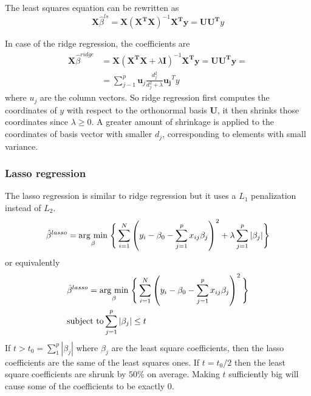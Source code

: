 The least squares equation can be rewritten as 
\begin{equation}
\mathbf{X}\hat{\beta}^{ls}  = \mathbf{X\left( X^TX\right)}^{-1}\mathbf{X^Ty} = \mathbf{UU^T}y
\end{equation}

In case of the ridge regression, the coefficients are
\begin{equation}
\begin{aligned}
\mathbf{X}\hat{\beta}^{ridge}  &= \mathbf{X}\left( \mathbf{X^TX} +\lambda \mathbf{I} \right)^{-1}\mathbf{X^Ty} = \mathbf{UU^Ty} =\\
&= \sum_{j-1}^p \mathbf{u}_j \frac{d_j^2}{d_j^2+\lambda} \mathbf{u_j}^Ty
\end{aligned}
\end{equation}
where $u_j$ are the column vectors. So ridge regression first computes the coordinates of $y$ with respect to the orthonormal basis $\mathbf{U}$, it then shrinks those coordinates since $\lambda\ge0$. A greater amount of shrinkage is applied to the coordinates of basis vector with smaller $d_j$, corresponding to elements with small variance.

\subsubsection{Lasso regression}
The lasso regression is similar to ridge regression but it uses a $L_1$ penalization instead of $L_2$.
\begin{equation}
\label{blasso}
\hat{\beta}^{lasso} = \underset{\beta}{\operatorname{arg}\,\operatorname{min}}\; \Bigg\lbrace \sum_{i=1}^N \left( y_i -  \beta_0 - \sum_{j=1}^p x_{ij} \beta_j\right)^2+ \lambda \sum_{j=1}^p |\beta_j| \Bigg\rbrace
\end{equation}
or equivalently
\begin{equation}
\begin{aligned}
&\hat{\beta}^{lasso} = \underset{\beta}{\operatorname{arg}\,\operatorname{min}}\; \Bigg\lbrace \sum_{i=1}^N \left( y_i -  \beta_0 - \sum_{j=1}^p x_{ij} \beta_j\right)^2 \Bigg\rbrace\\
&\text{subject to} \sum_{j=1}^p |\beta_j| \le t
\end{aligned}
\end{equation}
If $t>t_0= \sum_1^p |\beta_j|$ where $\beta_j$ are the least square coefficients, then the lasso coefficients are the same of the least squares ones. If $t=t_0/2$ then the least square coefficients are shrunk by $50\%$ on average. Making $t$ sufficiently big will cause some of the coefficients to be exactly $0$.

